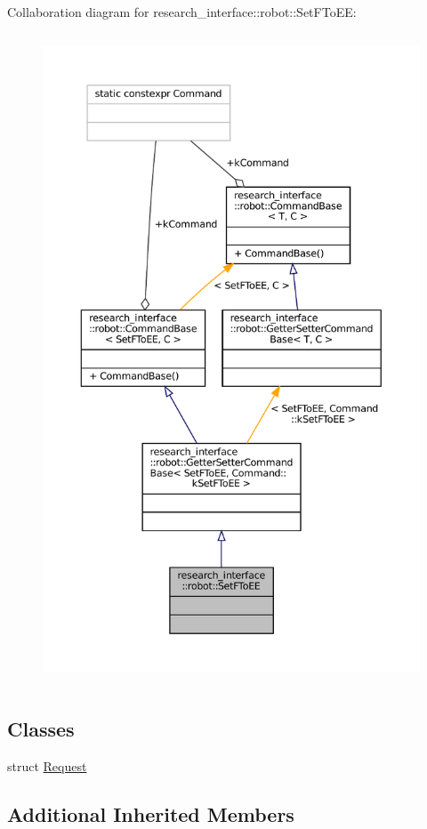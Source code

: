 Collaboration diagram for research\+\_\+interface\+:\+:robot\+:\+:Set\+F\+To\+EE\+:
\nopagebreak
\begin{figure}[H]
\begin{center}
\leavevmode
\includegraphics[height=550pt]{structresearch__interface_1_1robot_1_1SetFToEE__coll__graph}
\end{center}
\end{figure}
\subsection*{Classes}
\begin{DoxyCompactItemize}
\item 
struct \hyperlink{structresearch__interface_1_1robot_1_1SetFToEE_1_1Request}{Request}
\end{DoxyCompactItemize}
\subsection*{Additional Inherited Members}


